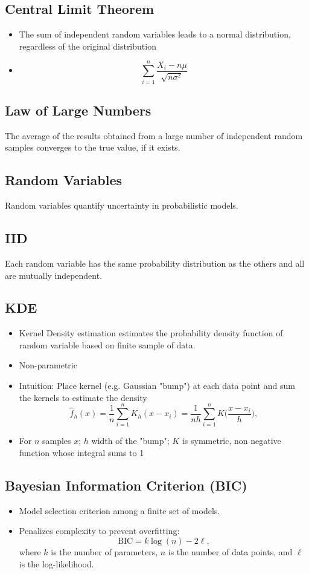 \documentclass[12pt,a4paper]{article}
\begin{document}
\subsection{Central Limit Theorem}
\begin{itemize}
    \item The sum of independent random variables leads to a normal distribution, regardless of the original distribution
    \item \[\sum_{i=1}^n \frac{X_i-n\mu}{\sqrt{n\sigma^2}}\]
\end{itemize}
\subsection{Law of Large Numbers}
The average of the results obtained from a large number of independent random samples converges to the true value, if it exists.
\subsection{Random Variables}
Random variables quantify uncertainty in probabilistic models.
\subsection{IID}
Each random variable has the same probability distribution as the others and all are mutually independent.

\subsection{KDE}
\begin{itemize}
    \item Kernel Density estimation estimates the probability density function of random variable based on finite sample of data. 
    \item Non-parametric

    \item Intuition: Place kernel (e.g. Gaussian "bump") at each data point and sum the kernels to estimate the density
    \[{\displaystyle {\widehat {f}}_{h}(x)={\frac {1}{n}}\sum _{i=1}^{n}K_{h}(x-x_{i})={\frac {1}{nh}}\sum _{i=1}^{n}K{\Big (}{\frac {x-x_{i}}{h}}{\Big )},}\]
    \item For $n$ samples $x$; $h$ width of the "bump"; $K$ is symmetric, non negative function whose integral sums to 1
\end{itemize}


\subsection{Bayesian Information Criterion (BIC)}
\begin{itemize}
    \item Model selection criterion among a finite set of models.
    \item Penalizes complexity to prevent overfitting:
    \[ \text{BIC} = k \log(n) - 2 \ell, \]
    where $k$ is the number of parameters, $n$ is the number of data points, and $\ell$ is the log-likelihood.
\end{itemize}
\end{document}
